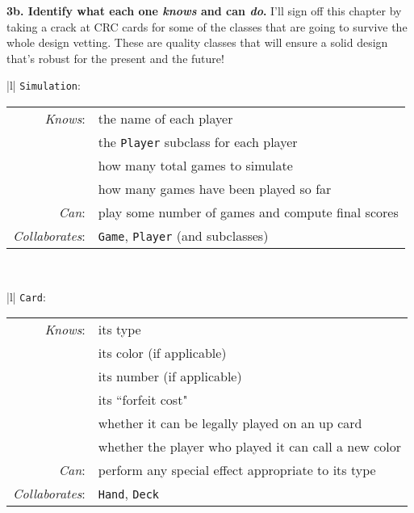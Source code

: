 \vspace{.1in}
\textbf{3b. Identify what each one \textit{knows} and can \textit{do}.}
I'll sign off this chapter by taking a crack at CRC cards for some of the
classes that are going to survive the whole design vetting. These are quality
classes that will ensure a solid design that's robust for the present and the
future!

\small
\begin{center}
\begin{tabular}{|l|}
\hline
\texttt{Simulation}:\\
\hline
\begin{tabular}{rl}
\textit{Knows}: & the name of each player \\
& the \texttt{Player} subclass for each player \\
& how many total games to simulate \\
& how many games have been played so far \\
\textit{Can}: & play some number of games and compute final scores \\
\hline
\textit{Collaborates}: & \texttt{Game}, \texttt{Player} (and subclasses)\\
\end{tabular}\\
\hline
\end{tabular}
\end{center}

\begin{center}
\begin{tabular}{|l|}
\hline
\texttt{Card}:\\
\hline
\begin{tabular}{rl}
\textit{Knows}: & its type \\
& its color (if applicable) \\
& its number (if applicable) \\
& its ``forfeit cost" \\
& whether it can be legally played on an up card \\
& whether the player who played it can call a new color \\
\textit{Can}: & perform any special effect appropriate to its type \\
\hline
\textit{Collaborates}: & \texttt{Hand}, \texttt{Deck} \\
\end{tabular}\\
\hline
\end{tabular}
\end{center}

